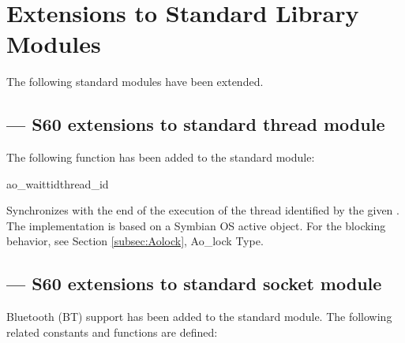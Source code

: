 %
%
%

\section{Extensions to Standard Library Modules}
\label{extensions}

The following standard modules have been extended.

\subsection{ ---
  S60 extensions to standard thread module} 
\label{subsec:thread}


The following function has been added to the standard  
module:

\begin{funcdesc}{ao_waittid}{thread_id}

Synchronizes with the end of the execution of the thread identified by the given 
. The implementation is based on a Symbian OS active object. 
For the blocking behavior, see Section \ref{subsec:Aolock}, Ao_lock Type.

\end{funcdesc}

\subsection{ ---
  S60 extensions to standard socket module} 
\label{subsec:socket}


Bluetooth (BT) support has been added to the standard  
module. The following related constants and functions are defined:

